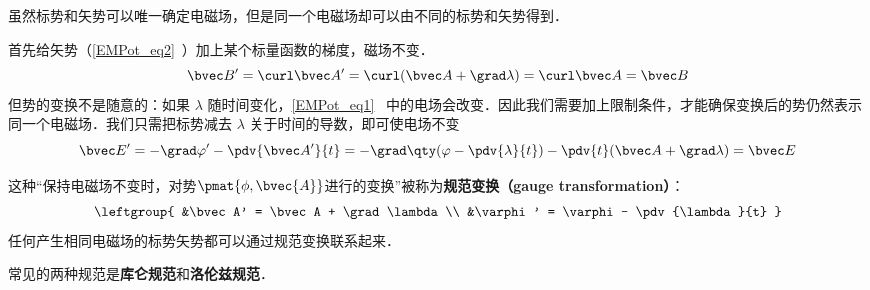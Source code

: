 
\begin{issues}
\issueDraft
\end{issues}


虽然标势和矢势可以唯一确定电磁场，但是同一个电磁场却可以由不同的标势和矢势得到．

首先给矢势（\autoref{EMPot_eq2}~）加上某个标量函数的梯度，磁场不变．
\begin{equation}
\bvec B' = \curl \bvec A' = \curl (\bvec A + \grad \lambda) = \curl \bvec A = \bvec B
\end{equation}
但势的变换不是随意的：如果 $\lambda$ 随时间变化，\autoref{EMPot_eq1}~ 中的电场会改变．因此我们需要加上限制条件，才能确保变换后的势仍然表示同一个电磁场．我们只需把标势减去 $\lambda$ 关于时间的导数，即可使电场不变
\begin{equation}
\bvec E' = -\grad \varphi' - \pdv{\bvec A'}{t} = -\grad \qty(\varphi - \pdv{\lambda}{t}) - \pdv{t} (\bvec A + \grad \lambda) = \bvec E
\end{equation}


这种“保持电磁场不变时，对势$\pmat{\phi, \bvec{A}}$进行的变换”被称为\textbf{规范变换（gauge transformation）}：
\begin{equation}\label{Gauge_eq3}
\leftgroup{
&\bvec A' = \bvec A + \grad \lambda\\
&\varphi' = \varphi - \pdv{\lambda}{t}
}\end{equation}
任何产生相同电磁场的标势矢势都可以通过规范变换联系起来．

常见的两种规范是\textbf{库仑规范}和\textbf{洛伦兹规范}．
